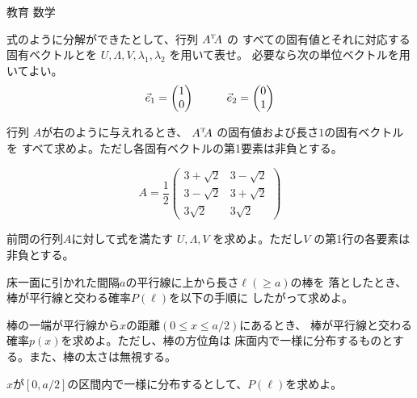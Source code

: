 \documentclass[fleqn]{jbook}
\begin{document}
\begin{question}{教育 数学}{}
\begin{subquestions}
  \begin{subsubquestions}
  \SubSubQuestion
    式のように分解ができたとして、行列 $\Trans{A}A$ の
    すべての固有値とそれに対応する固有ベクトルとを
    $U, \Lambda, V, \lambda_1, \lambda_2$ を用いて表せ。
    必要なら次の単位ベクトルを用いてよい。
%
    \[%
      \vec{e}_1 = \begin{pmatrix} 1 \\ 0 \end{pmatrix} \hspace{10mm} %
      \vec{e}_2 = \begin{pmatrix} 0 \\ 1 \end{pmatrix} %
    \]
%

  \SubSubQuestion
    \parbox[t]{100mm}{
    行列 $A$が右のように与えれるとき、
    $ \Trans{A}A$ の固有値および長さ$1$の固有ベクトルを
    すべて求めよ。ただし各固有ベクトルの第1要素は非負とする。
    }\parbox[t]{50mm}{\vspace*{-5mm}
    \[ A = \frac{1}{2}\begin{pmatrix}%
      3+\sqrt{2} & 3-\sqrt{2} \\
      3-\sqrt{2} & 3+\sqrt{2} \\
      3\sqrt{2}  & 3\sqrt{2}  \end{pmatrix} \]
    }

  \SubSubQuestion
    前問の行列$A$に対して式を満たす
    $U, \Lambda, V$ を求めよ。ただし$V$ の第1行の各要素は非負とする。

  \end{subsubquestions}



\SubQuestion
  \parbox[t]{100mm}{
  床一面に引かれた間隔$a$の平行線に上から長さ$\ell(\geq a)$の棒を
  落としたとき、棒が平行線と交わる確率$P(\ell)$を以下の手順に
  したがって求めよ。

  \begin{subsubquestions}
  \SubSubQuestion
    棒の一端が平行線から$x$の距離$(0\leq x \leq a/2)$にあるとき、
    棒が平行線と交わる確率$p(x)$を求めよ。ただし、棒の方位角は
    床面内で一様に分布するものとする。また、棒の太さは無視する。

  \SubSubQuestion
    $x$が$[0,a/2]$の区間内で一様に分布するとして、$P(\ell)$を求めよ。

  \end{subsubquestions}

}
\end{subquestions}
\end{question}
\end{document}

